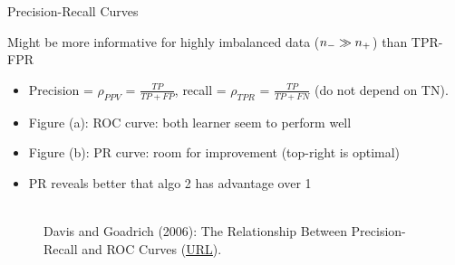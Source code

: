 \begin{vbframe}{Precision-Recall Curves}


\begin{footnotesize}

Might be more informative for highly imbalanced data ($n_{-} \gg n_{+}$) than TPR-FPR

\begin{itemize}
  \item Precision = $\rho_{PPV}$ = $\frac{TP}{TP + FP}$, recall = $\rho_{TPR}$ = $\frac{TP}{TP + FN}$
  (do not depend on TN).
  \item Figure (a): ROC curve: both learner seem to perform well
  \item Figure (b): PR curve: room for improvement (top-right is optimal)
  \item PR reveals better that algo 2 has advantage over 1
\end{itemize}

\end{footnotesize}

\begin{figure}
  \centering
  \tiny
  \\Davis and Goadrich (2006): The Relationship Between Precision-Recall and
  ROC Curves (\href{https://www.biostat.wisc.edu/~page/rocpr.pdf}
  {\underline{URL}}).
\end{figure}


\end{vbframe}
